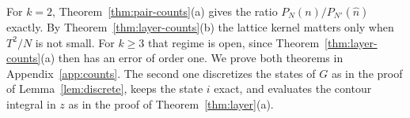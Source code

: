 For $k=2$, Theorem~\ref{thm:pair-counts}(a) gives the ratio $P_N(n)/P_{N'}(\hat n)$ exactly. By
Theorem~\ref{thm:layer-counts}(b) the lattice kernel matters only when $T^2/N$ is not small.
For $k\ge3$ that regime is open, since Theorem~\ref{thm:layer-counts}(a) then has an error of order
one. We prove both theorems in Appendix~\ref{app:counts}. The second one discretizes the
states of $G$ as in the proof of Lemma~\ref{lem:discrete}, keeps the state $i$ exact, and evaluates
the contour integral in $z$ as in the proof of Theorem~\ref{thm:layer}(a).
